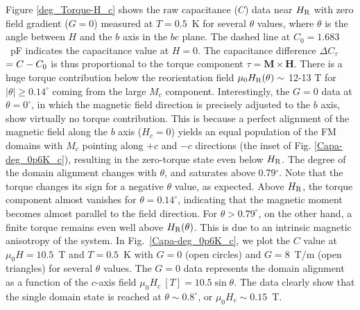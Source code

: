 \documentclass[twocolumn, aps, superscriptaddress, amsfonts,floatfix]{revtex4}%
\begin{document}
{%
Figure \ref{deg_Torque-H_c} shows the raw capacitance ($C$) data near $H_{\rm R}$ with zero field gradient ($G = 0$) measured at $T=0.5$~K for several $\theta$ values, where $\theta$ is the angle between $H$ and the $b$ axis in the $bc$ plane. 
The dashed line at $C_0=1.683$~pF indicates the capacitance value at $H=0$. The capacitance difference $\Delta C_{\tau}$ $= C - C_{\rm 0}$ is thus proportional to the torque component $\tau = {\bm M} \times {\bm H}$.
There is a huge torque contribution below the reorientation field $\mu_0H_{\rm R}(\theta)\sim$ 12-13 T for $|\theta|\ge0.14^\circ$ coming from the large $M_c$ component.
Interestingly, the $G = 0$ data at $\theta = 0^\circ$, in which the magnetic field direction is precisely adjusted to the $b$ axis, show virtually no torque contribution.
This is because a perfect alignment of the magnetic field along the $b$ axis ($H_c=0$) yields an equal population of the FM  domains with $M_c$ pointing along $+c$ and $-c$ directions (the inset of Fig. \ref{Capa-deg_0p6K_c}), resulting in the zero-torque state even below $H_{\rm R}$.
The degree of the domain alignment changes with $\theta$, and saturates above 0.79$^\circ$. Note that the torque changes its sign for a negative $\theta$ value, as expected.
Above $H_{\rm R}$, the torque component almost vanishes for $\theta=0.14^\circ$, indicating that the  magnetic moment becomes almost parallel to the field direction. 
For  $\theta>0.79^\circ$, on the other hand, a finite torque remains even well above $H_{\rm R}(\theta)$. This is due to an intrinsic magnetic anisotropy of the system.
In Fig.~\ref{Capa-deg_0p6K_c},  we plot the $C$ value at $\mu_0H=10.5$~T and $T=0.5$~K with $G=0$ (open circles) and $G=8$~T/m (open triangles) for several $\theta$ values. The $G=0$ data represents the domain alignment as a function of the $c$-axis field $\mu_0H_c~[T]=10.5\sin\theta$. 
The data clearly show that the single domain state is reached at $\theta\sim 0.8^\circ$, or $\mu_0H_c\sim 0.15$~T. 







}
\end{document}
